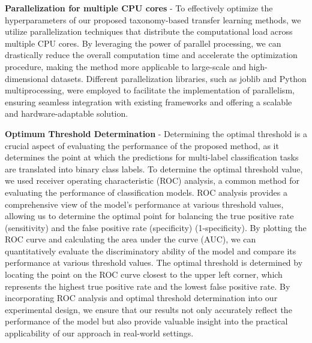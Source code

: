 \textbf{Parallelization for multiple CPU cores} - To effectively optimize the hyperparameters of our proposed taxonomy-based transfer learning methods, we utilize parallelization techniques that distribute the computational load across multiple CPU cores. By leveraging the power of parallel processing, we can drastically reduce the overall computation time and accelerate the optimization procedure, making the method more applicable to large-scale and high-dimensional datasets. Different parallelization libraries, such as joblib and Python multiprocessing, were employed to facilitate the implementation of parallelism, ensuring seamless integration with existing frameworks and offering a scalable and hardware-adaptable solution.

\textbf{Optimum Threshold Determination} - Determining the optimal threshold is a crucial aspect of evaluating the performance of the proposed method, as it determines the point at which the predictions for multi-label classification tasks are translated into binary class labels. To determine the optimal threshold value, we used receiver operating characteristic (ROC) analysis, a common method for evaluating the performance of classification models. ROC analysis provides a comprehensive view of the model's performance at various threshold values, allowing us to determine the optimal point for balancing the true positive rate (sensitivity) and the false positive rate (specificity) (1-specificity). By plotting the ROC curve and calculating the area under the curve (AUC), we can quantitatively evaluate the discriminatory ability of the model and compare its performance at various threshold values. The optimal threshold is determined by locating the point on the ROC curve closest to the upper left corner, which represents the highest true positive rate and the lowest false positive rate. By incorporating ROC analysis and optimal threshold determination into our experimental design, we ensure that our results not only accurately reflect the performance of the model but also provide valuable insight into the practical applicability of our approach in real-world settings.

